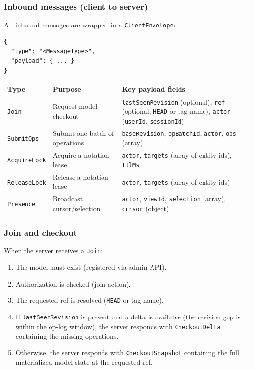 \subsubsection{Inbound messages (client to server)}

All inbound messages are wrapped in a \texttt{ClientEnvelope}:

\begin{lstlisting}[caption={ClientEnvelope shape}]
{
  "type": "<MessageType>",
  "payload": { ... }
}
\end{lstlisting}

\begin{longtable}{p{32mm}p{52mm}p{70mm}}
\toprule
Type & Purpose & Key payload fields \\
\midrule
\texttt{Join} & Request model checkout &
  \texttt{lastSeenRevision} (optional),
  \texttt{ref} (optional; \texttt{HEAD} or tag name),
  \texttt{actor} (\texttt{userId}, \texttt{sessionId}) \\
\texttt{SubmitOps} & Submit one batch of operations &
  \texttt{baseRevision},
  \texttt{opBatchId},
  \texttt{actor},
  \texttt{ops} (array) \\
\texttt{AcquireLock} & Acquire a notation lease &
  \texttt{actor},
  \texttt{targets} (array of entity ids),
  \texttt{ttlMs} \\
\texttt{ReleaseLock} & Release a notation lease &
  \texttt{actor},
  \texttt{targets} (array of entity ids) \\
\texttt{Presence} & Broadcast cursor/selection &
  \texttt{actor},
  \texttt{viewId},
  \texttt{selection} (array),
  \texttt{cursor} (object) \\
\bottomrule
\end{longtable}

\subsubsection{Join and checkout}

When the server receives a \texttt{Join}:

\begin{enumerate}
\item The model must exist (registered via admin API).
\item Authorization is checked (join action).
\item The requested ref is resolved (\texttt{HEAD} or tag name).
\item If \texttt{lastSeenRevision} is present and a delta is available
  (the revision gap is within the op-log window), the server responds
  with \texttt{CheckoutDelta} containing the missing operations.
\item Otherwise, the server responds with \texttt{CheckoutSnapshot}
  containing the full materialized model state at the requested ref.
\end{enumerate}

